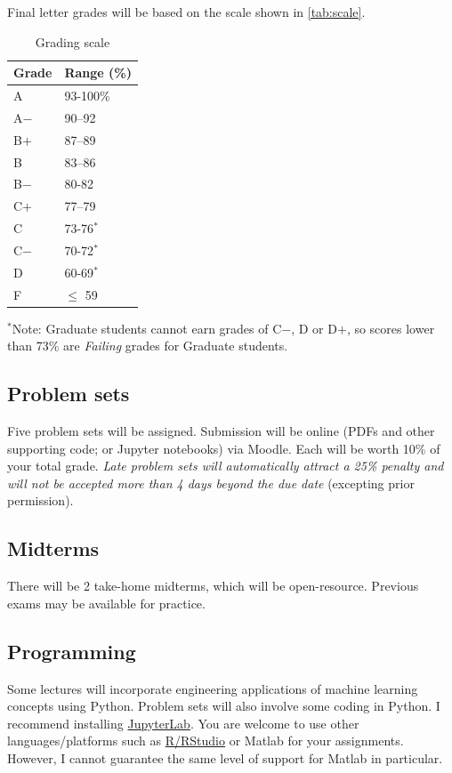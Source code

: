 \documentclass[11pt,twoside]{article}
\numberwithin{equation}{section}
\newcommand{\?}{\stackrel{?}{=}}
\begin{document}
\noindent Final letter grades will be based on the scale shown in \autoref{tab:scale}. 


\begin{table}[h!]\centering
  \caption{Grading scale}
\label{tab:scale}
\begin{tabular}{l l}\toprule
 \bf Grade & \bf Range (\%) \\\midrule
  A & 93-100\%   \\
  A$-$ & 90--92 \\
  B$+$ & 87--89 \\
  B &   83--86 \\
  B$-$ & 80-82 \\
  C$+$  & 77--79\\
  C   & 73-76$^*$ \\
  C$-$ & 70-72$^*$ \\
  D & 60-69$^*$ \\
  F &  $\le$ 59\\\bottomrule
\end{tabular}
\end{table}
\noindent $^*$Note: Graduate students cannot earn grades of C$-$, D or D$+$, so scores lower than 73\% are \textit{Failing} grades for Graduate students.




\subsection{Problem sets}
Five problem sets will be assigned.  Submission will be online (PDFs and other supporting code; or Jupyter notebooks) via Moodle.  Each will be worth 10\% of your
total grade.  \textit{Late problem sets will automatically attract a 25\% penalty and will not be accepted more than 4 days beyond the due date} (excepting prior permission).

\subsection{Midterms}
There will be 2 take-home midterms, which will be
open-resource. Previous exams may be available for practice.

\subsection{Programming}
Some lectures will incorporate engineering applications of machine learning concepts using  Python.
Problem sets will also involve some coding in Python.
I recommend installing \href{https://jupyter.org/}{JupyterLab}.
You are welcome to use other languages/platforms such as \href{https://rstudio.com/products/rstudio/download/}{R/RStudio} or Matlab for your assignments.
However, I cannot guarantee the same level of support for Matlab in particular.
\end{document}
